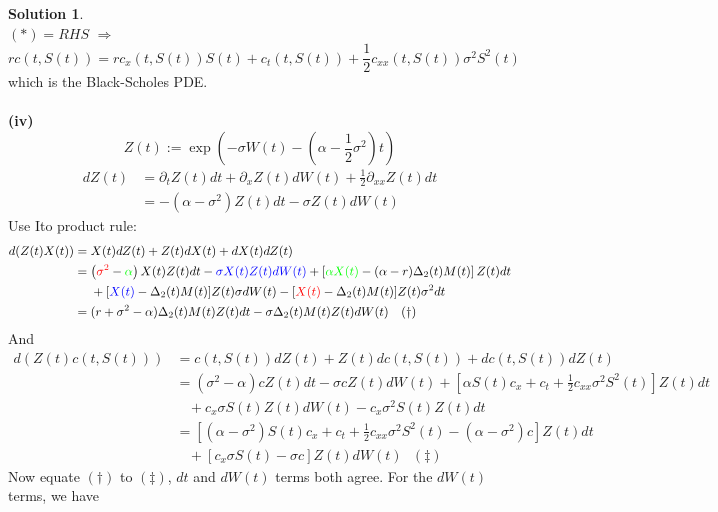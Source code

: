\documentclass[a4paper, 10pt]{article}
\theoremstyle{definition}
\theoremstyle{hSol}
\newtheorem*{solution}{Solution}
\begin{document}
\begin{solution}
\begin{equation}
\end{equation}
$(*) = RHS$ $\Rightarrow$
$$
rc(t,S(t)) = rc_x(t,S(t))S(t) + c_t(t,S(t)) + \frac{1}{2}c_{xx}(t,S(t))\sigma^2 S^2(t)
$$
which is the Black-Scholes PDE.\\
~\\
\textbf{(iv)} 
$$
Z(t):= \exp\left(-\sigma W(t) - \left(\alpha - \frac{1}{2}\sigma^2\right)t\right)
$$
\begin{equation}
	\begin{split}
		dZ(t) &= \partial_t Z(t) dt + \partial_x Z(t) dW(t) + \frac{1}{2} \partial_{xx}Z(t)  dt  \\
		&= -\left(\alpha-\sigma^2\right) Z(t)dt -\sigma Z(t)dW(t) 
	\end{split}
\end{equation}
Use Ito product rule:
\begin{equation}
	\begin{split}
		d(Z(t)X(t)) &= X(t)dZ(t) + Z(t)dX(t) + dX(t)dZ(t) \\
		&=\left(\textcolor{red}{\sigma^2}- \textcolor{green}{\alpha}\right) X(t)Z(t)dt -\textcolor{blue}{\sigma X(t)Z(t)dW(t)} + \left[\textcolor{green}{\alpha X(t)}-(\alpha - r)\Delta_2(t) M(t)\right] Z(t)dt \\
		&~~~~+ [\textcolor{blue}{X(t)}-\Delta_2(t) M(t)]Z(t)\sigma dW(t) - [\textcolor{red}{X(t)}-\Delta_2(t) M(t)]Z(t)\sigma^2 dt \\
		&= (r+\sigma^2-\alpha)\Delta_2(t) M(t)Z(t)dt - \sigma\Delta_2(t) M(t)Z(t) dW(t)~~~(\dag)
	\end{split}
\end{equation}
And
\begin{equation}
	\begin{split}
		d(Z(t)c(t,S(t))) &= c(t,S(t))dZ(t) + Z(t)dc(t,S(t)) + dc(t,S(t))dZ(t) \\
		&= \left(\sigma^2- \alpha \right) cZ(t)dt -\sigma c Z(t)dW(t) + \left[\alpha S(t) c_x + c_t + \frac{1}{2}c_{xx}\sigma^2 S^2(t)\right]Z(t)dt \\
		&~~~~+c_x\sigma S(t)Z(t)dW(t) - c_x\sigma^2 S(t)Z(t)dt \\
		&= \left[(\alpha-\sigma^2) S(t) c_x + c_t + \frac{1}{2}c_{xx}\sigma^2 S^2(t) - (\alpha - \sigma^2) c\right]Z(t)dt \\
		&~~~~+[c_x\sigma S(t)- \sigma c]Z(t)dW(t)~~~(\ddag)
	\end{split}
\end{equation}
Now equate $(\dag)$ to $(\ddag)$, $dt$ and $dW(t)$ terms both agree. For the $dW(t)$ terms, we have
\begin{equation}

\end{equation}
\end{solution}
\end{document}
